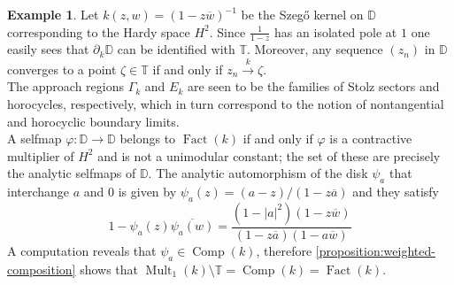 \documentclass[leqno, final]{article}
\theoremstyle{definition}
\newtheorem{example}{Example}
\newcommand{\xto}[1]{\stackrel{#1}{\to}}
\newcommand{\disk}{\mathbb{D}}
\newcommand{\torus}{\mathbb{T}}
\newcommand{\rand}{\partial}
\renewcommand{\phi}{\varphi}
\DeclareMathOperator{\Fact}{Fact}
\DeclareMathOperator{\Mult}{Mult}
\DeclareMathOperator{\Comp}{Comp}
\begin{document}
\begin{example}\label{example:szego}
Let $k(z,w) = (1-z\overline w)^{-1}$ be the Szegő kernel on $\disk$ corresponding to the
Hardy space $H^2$. Since $\frac1{1-z}$ has
an isolated pole at $1$ one easily sees that $\rand_k\disk$ can be identified with
$\torus$. Moreover, any sequence $(z_n)$ in $\disk$ converges to a point $\zeta\in\torus$
if and only if $z_n\xto{k}\zeta$.
\\ The approach regions $\Gamma_k$ and $E_k$ are seen to be the families of Stolz sectors
and horocycles, respectively, which in turn correspond to the notion of nontangential
and horocyclic boundary limits.
\\ A selfmap $\phi:\disk\to\disk$ belongs to $\Fact(k)$ if and only if $\phi$ is a
contractive multiplier of $H^2$ and is not a unimodular constant; the set of these are
precisely the analytic selfmaps of $\disk$.
The analytic automorphism of the disk $\psi_a$ that interchange $a$ and $0$ is
given by $\psi_a(z) = (a-z)/(1-z\overline a)$ and they
satisfy \begin{equation}\label{equation:disk-automorphism}
	1 - \psi_a(z)\overline{\psi_a(w)}
	= \frac{(1-|a|^2)(1-z\overline w)}{(1-z\overline a)(1-a\overline w)}
\end{equation}
A computation reveals that $\psi_a\in\Comp(k)$, therefore \cref{proposition:weighted-composition}
shows that $\Mult_1(k)\setminus\torus=\Comp(k)=\Fact(k)$.
\end{example}
\end{document}

